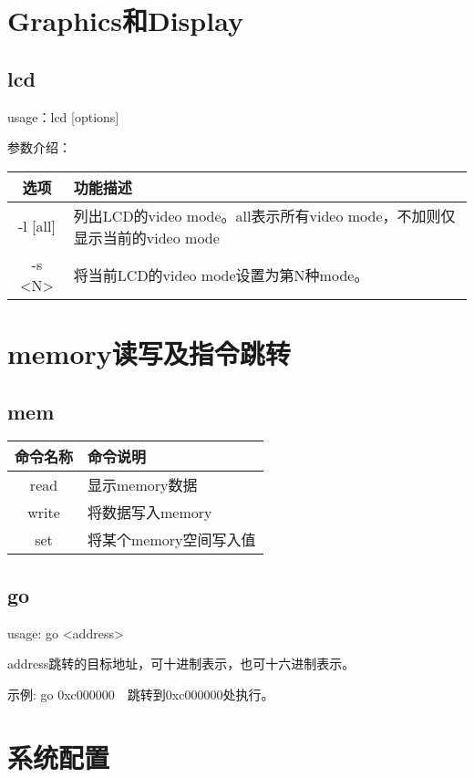 \section{Graphics和Display}
\subsection{lcd}
usage：lcd [options]

参数介绍：
\begin{table}[H]
\setlength{\parindent}{0pt}
\begin{tabular}{|c|l|} \hline
选项 & 功能描述 \\ \hline
-l [all] & 列出LCD的video mode。all表示所有video mode，不加则仅显示当前的video mode \\ \hline
-s <N> & 将当前LCD的video mode设置为第N种mode。 \\ \hline
\end{tabular}
\end{table}

\section{memory读写及指令跳转}

\subsection{mem}
\begin{table}[H]
\begin{tabular}{|c|l|}
\hline
命令名称 & 命令说明\\ \hline
read & 显示memory数据\\ \hline
write & 将数据写入memory\\ \hline
set & 将某个memory空间写入值\\ \hline
\end{tabular}
\end{table}

\subsection{go}
usage: go <address>

address跳转的目标地址，可十进制表示，也可十六进制表示。

示例: go 0xc000000　跳转到0xc000000处执行。

\section{系统配置}
